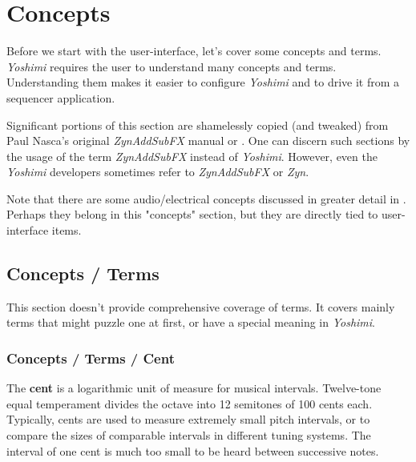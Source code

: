 %
%
%

\section{Concepts}
\label{sec:concepts}

   Before we start with the user-interface, let's cover some concepts and terms.
   \textsl{Yoshimi} requires the user to understand many concepts and terms.
   Understanding them makes it easier to configure \textsl{Yoshimi}
   and to drive it from a sequencer application.
   
   Significant portions of this section are shamelessly copied (and tweaked)
   from Paul Nasca's original \textsl{ZynAddSubFX}
   manual \cite{zynodt} or \cite{zynpdf}.
   One can discern such sections by the usage of the term
   \textsl{ZynAddSubFX} instead of \textsl{Yoshimi}.
   However, even the \textsl{Yoshimi} developers sometimes
   refer to \textsl{ZynAddSubFX} or \textsl{Zyn}.

   Note that there are some audio/electrical concepts discussed in greater
   detail in .
   Perhaps they belong in this "concepts" section, but
   they are directly tied to user-interface items.

\subsection{Concepts / Terms}
\label{subsec:concepts_terms}

   This section doesn't provide comprehensive coverage of terms.  It
   covers mainly terms that might puzzle one at first, or have a
   special meaning in \textsl{Yoshimi}.

\subsubsection{Concepts / Terms / Cent}
\label{subsubsec:concepts_terms_cent}

   The \textbf{cent}
   is a logarithmic unit of measure for musical intervals.
   Twelve-tone equal temperament divides the octave into 12
   semitones of 100 cents each. Typically, cents are used to measure
   extremely small pitch intervals, or to compare the sizes of comparable
   intervals in different tuning systems.
   The interval of one cent is much too small to be heard between
   successive notes.

